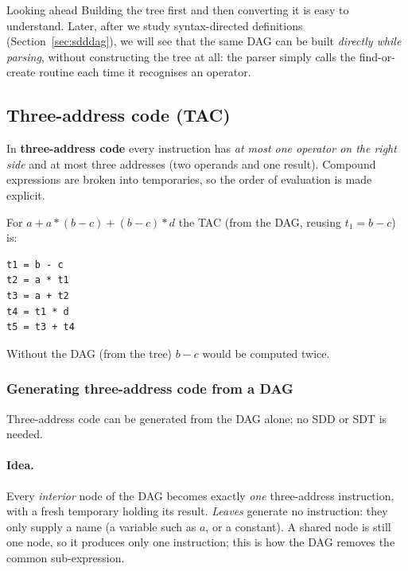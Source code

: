 \documentclass[11pt,a4paper]{article}
\begin{document}
\begin{notebox}{Looking ahead}
Building the tree first and then converting it is easy to understand. Later, after we study syntax-directed definitions (Section~\ref{sec:sdddag}), we will see that the same DAG can be built \emph{directly while parsing}, without constructing the tree at all: the parser simply calls the find-or-create routine each time it recognises an operator.
\end{notebox}

\subsection{Three-address code (TAC)}
In \textbf{three-address code} every instruction has \emph{at most one operator on the right side} and at most three addresses (two operands and one result). Compound expressions are broken into temporaries, so the order of evaluation is made explicit.

For $a + a*(b-c) + (b-c)*d$ the TAC (from the DAG, reusing $t_1 = b-c$) is:
\begin{lstlisting}
t1 = b - c
t2 = a * t1
t3 = a + t2
t4 = t1 * d
t5 = t3 + t4
\end{lstlisting}
Without the DAG (from the tree) $b-c$ would be computed twice.

\subsubsection{Generating three-address code from a DAG}\label{sec:tacdag}
\label{sec:dag2tac}
Three-address code can be generated from the DAG alone; no SDD or SDT is needed.

\paragraph{Idea.} Every \emph{interior} node of the DAG becomes exactly \emph{one} three-address instruction, with a fresh temporary holding its result. \emph{Leaves} generate no instruction: they only supply a name (a variable such as $a$, or a constant). A shared node is still one node, so it produces only one instruction; this is how the DAG removes the common sub-expression.
\end{document}
